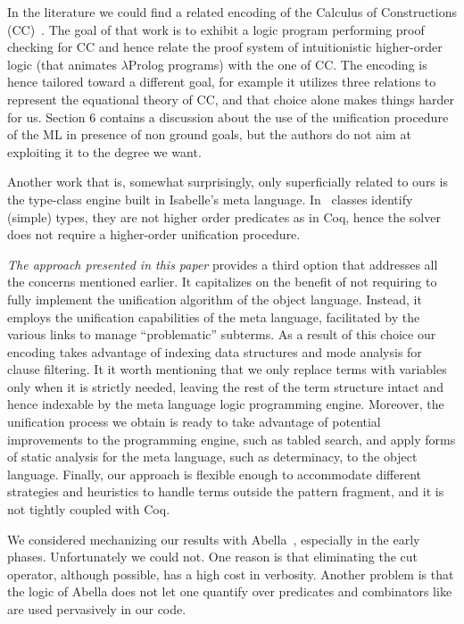 \documentclass[sigconf,natbib=false,review]{acmart}
\begin{document}
In the literature we could find a related encoding of the Calculus of
Constructions (CC)~\cite{felty93lics}. The goal of that work is to exhibit
a logic program performing proof checking for CC and hence relate the
proof system of intuitionistic higher-order logic (that animates $\lambda$Prolog
programs) with the one of CC. The encoding is hence tailored
toward a different goal, for example it utilizes three relations to represent the
equational theory of CC, and that choice alone makes things harder for us.
Section 6 contains a discussion about the use of the
unification procedure of the ML in presence of non ground goals, but
the authors do not aim at exploiting it to the degree we want.

Another work that is, somewhat surprisingly, only superficially related to ours is the
type-class engine built in Isabelle's meta language. In~\cite{wenzel97}
classes identify (simple) types, they are not higher order predicates
as in Coq, hence the solver does not require a higher-order unification
procedure.

\emph{The approach presented in this paper}
provides a third option that addresses all the concerns
mentioned earlier. It capitalizes on the benefit of not requiring to fully
implement
the unification algorithm of the object language. Instead, it employs the
unification capabilities of the meta language, facilitated by the various links
to manage ``problematic'' subterms. As a result of this choice our encoding takes
advantage of indexing data structures and mode analysis for clause filtering.
It it worth mentioning that we only replace terms with variables only
when it is strictly needed, leaving the rest of the term structure intact
and hence indexable by the meta language logic programming engine.
Moreover, the unification process we obtain is ready to take
advantage of potential improvements to the programming engine,
such as tabled search, and apply forms of static analysis for
the meta language, such as determinacy, to the object language.
Finally, our approach is flexible enough to accommodate different strategies
and heuristics to handle terms outside the pattern fragment, and
it is not tightly coupled with Coq.

We considered mechanizing our results with Abella~\cite{gacek2008abella}, especially in the early phases.
Unfortunately we could not. One reason
is that eliminating the cut operator, although possible, has a high cost in
verbosity.
Another problem is that the logic of Abella does not let one quantify over
predicates and combinators like  are used pervasively in our
code.
\end{document}
